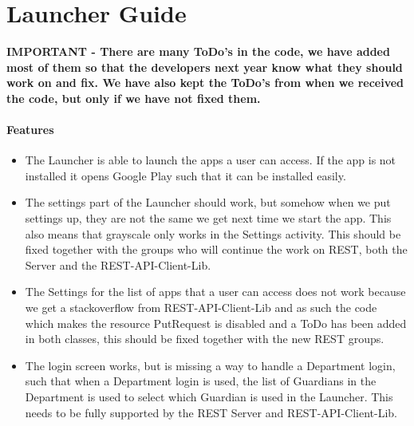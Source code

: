 \chapter{Launcher Guide}\label{WikiLauncher}

\textbf{IMPORTANT - There are many ToDo's in the code, we have added most of
them so that the developers next year know what they should work on and fix. We
have also kept the ToDo's from when we received the code, but only if we have
not fixed them.}

\subsubsection{Features}
\begin{itemize}
  \item The Launcher is able to launch the apps a user can access. If
  the app is not installed it opens Google Play such that it can be installed
  easily.
  \item The settings part of the Launcher should work, but somehow when
  we put settings up, they are not the same we get next time we start the app. This
  also means that grayscale only works in the Settings activity. This
  should be fixed together with the groups who will continue the work on REST,
  both the Server and the REST-API-Client-Lib.
  \item The Settings for the list of apps that a user can access does not work
  because we get a stackoverflow from REST-API-Client-Lib and as such the code
  which makes the resource PutRequest is disabled and a ToDo has been added in
  both classes, this should be fixed together with the new  REST groups.
  \item The login screen works, but is missing a way to handle a
  Department login, such that when a Department login is used,
  the list of Guardians in the Department is used to select
  which Guardian is used in the Launcher. This needs to be fully
  supported by the REST Server and REST-API-Client-Lib.
\end{itemize}

